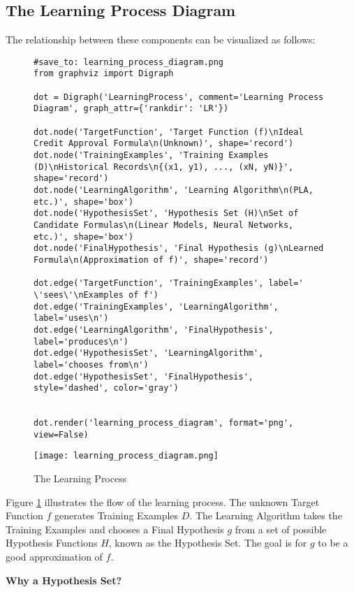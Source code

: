 \documentclass{article}
\begin{document}
\subsection{The Learning Process Diagram}

The relationship between these components can be visualized as follows:

\begin{figure}[H]
    \centering
    \begin{verbatim}
#save_to: learning_process_diagram.png
from graphviz import Digraph

dot = Digraph('LearningProcess', comment='Learning Process Diagram', graph_attr={'rankdir': 'LR'})

dot.node('TargetFunction', 'Target Function (f)\nIdeal Credit Approval Formula\n(Unknown)', shape='record')
dot.node('TrainingExamples', 'Training Examples (D)\nHistorical Records\n{(x1, y1), ..., (xN, yN)}', shape='record')
dot.node('LearningAlgorithm', 'Learning Algorithm\n(PLA, etc.)', shape='box')
dot.node('HypothesisSet', 'Hypothesis Set (H)\nSet of Candidate Formulas\n(Linear Models, Neural Networks, etc.)', shape='box')
dot.node('FinalHypothesis', 'Final Hypothesis (g)\nLearned Formula\n(Approximation of f)', shape='record')

dot.edge('TargetFunction', 'TrainingExamples', label='  \'sees\'\nExamples of f')
dot.edge('TrainingExamples', 'LearningAlgorithm', label='uses\n')
dot.edge('LearningAlgorithm', 'FinalHypothesis', label='produces\n')
dot.edge('HypothesisSet', 'LearningAlgorithm', label='chooses from\n')
dot.edge('HypothesisSet', 'FinalHypothesis', style='dashed', color='gray')


dot.render('learning_process_diagram', format='png', view=False)
    \end{verbatim}
    \centering
    \texttt{[image: learning\_process\_diagram.png]}
    \caption{The Learning Process}
    \label{fig:learning_process_diagram}
\end{figure}


Figure \ref{fig:learning_process_diagram} illustrates the flow of the learning process.  The unknown Target Function \(f\) generates Training Examples \(D\). The Learning Algorithm takes the Training Examples and chooses a Final Hypothesis \(g\) from a set of possible Hypothesis Functions \(H\), known as the Hypothesis Set. The goal is for \(g\) to be a good approximation of \(f\).

\textbf{Why a Hypothesis Set?}
\end{document}
